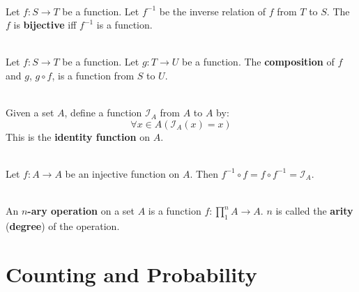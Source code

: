 \documentclass[12pt]{article}
\begin{document}
\begin{proposition}[Inverse(7.2.4)]
\hfill\\
\normalfont Let $f:S\to T$ be a function. Let $f^{-1}$ be the inverse relation of $f$ from $T$ to $S$. The $f$ is \textbf{bijective} iff $f^{-1}$ is a function.
\end{proposition}
\begin{proposition}[Composition(7.3.1)]
\hfill\\
\normalfont Let $f:S\to T$ be a function. Let $g:T\to U$ be a function. The \textbf{composition} of $f$ and $g$, $g\circ f$, is a function from $S$ to $U$.
\end{proposition}
\begin{definition}
\hfill\\
\normalfont Given a set $A$, define a function $\mathcal{I}_A$ from $A$ to $A$ by:
\[
\forall x\in A (\mathcal{I}_A(x)=x)
\]
This is the \textbf{identity function} on $A$.
\end{definition}
\begin{proposition}[7.3.3]
\hfill\\
\normalfont Let $f:A\to A$ be an injective function on $A$. Then $f^{-1}\circ f = f\circ f^{-1}= \mathcal{I}_A$.
\end{proposition}
\begin{definition}
\hfill\\
\normalfont An \textbf{$n$-ary operation} on a set $A$ is a function $f:\prod^n_1 A\to A$. $n$ is called the \textbf{arity} (\textbf{degree}) of the operation.
\end{definition}
\clearpage
\section{Counting and Probability}
\end{document}

